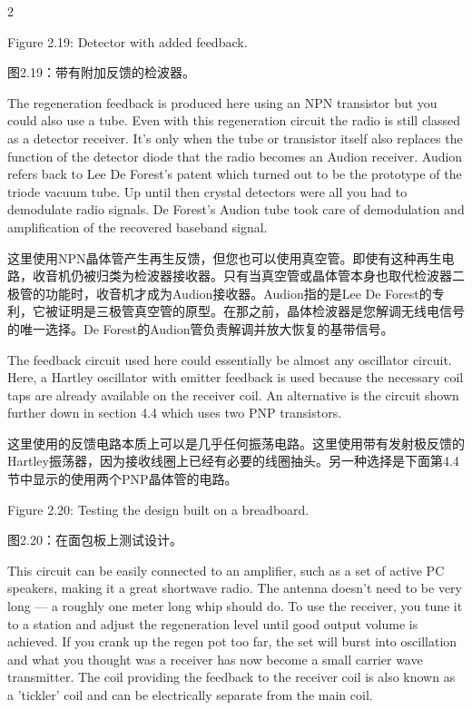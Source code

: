 \documentclass{ctexbook}
\begin{document}
\begin{paracol}{2}
\switchcolumn*

Figure 2.19: Detector with added feedback. 

\switchcolumn

图2.19：带有附加反馈的检波器。

\switchcolumn*

The regeneration feedback is produced here using an NPN transistor but you could also use 
a tube. Even with this regeneration circuit the radio is still classed as a detector receiver. 
It's only when the tube or transistor itself also replaces the function of the detector diode 
that the radio becomes an Audion receiver. Audion refers back to Lee De Forest's patent 
which turned out to be the prototype of the triode vacuum tube. Up until then crystal detectors were all you had to demodulate radio signals. De Forest's Audion tube took care of 
demodulation and amplification of the recovered baseband signal. 

\switchcolumn

这里使用NPN晶体管产生再生反馈，但您也可以使用真空管。即使有这种再生电路，收音机仍被归类为检波器接收器。只有当真空管或晶体管本身也取代检波器二极管的功能时，收音机才成为Audion接收器。Audion指的是Lee De Forest的专利，它被证明是三极管真空管的原型。在那之前，晶体检波器是您解调无线电信号的唯一选择。De Forest的Audion管负责解调并放大恢复的基带信号。

\switchcolumn*

The feedback circuit used here could essentially be almost any oscillator circuit. Here, a 
Hartley oscillator with emitter feedback is used because the necessary coil taps are already 
available on the receiver coil. An alternative is the circuit shown further down in section 4.4 
which uses two PNP transistors.

\switchcolumn

这里使用的反馈电路本质上可以是几乎任何振荡电路。这里使用带有发射极反馈的Hartley振荡器，因为接收线圈上已经有必要的线圈抽头。另一种选择是下面第4.4节中显示的使用两个PNP晶体管的电路。

\switchcolumn*

Figure 2.20: Testing the design built on a breadboard. 

\switchcolumn

图2.20：在面包板上测试设计。

\switchcolumn*

This circuit can be easily connected to an amplifier, such as a set of active PC speakers, 
making it a great shortwave radio. The antenna doesn't need to be very long — a roughly 
one meter long whip should do. To use the receiver, you tune it to a station and adjust the 
regeneration level until good output volume is achieved. If you crank up the regen pot too 
far, the set will burst into oscillation and what you thought was a receiver has now become 
a small carrier wave transmitter. The coil providing the feedback to the receiver coil is also 
known as a 'tickler' coil and can be electrically separate from the main coil. 


\end{paracol}
\end{document}
